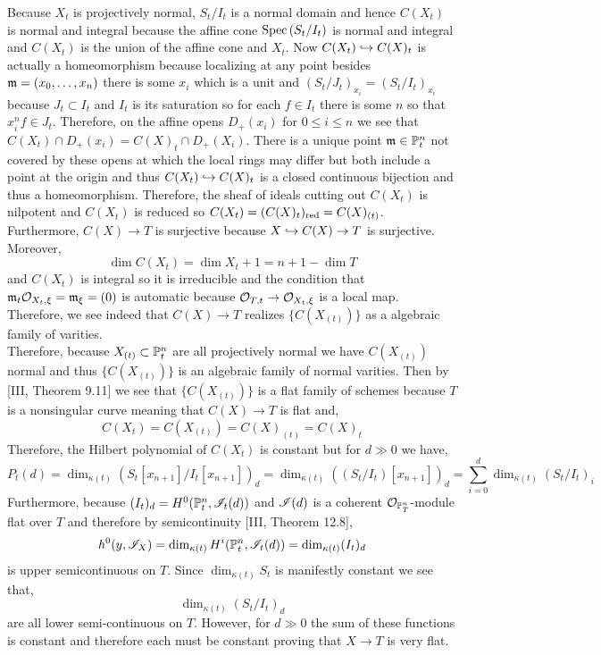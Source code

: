\documentclass[12pt]{article}
\begin{document}
\begin{enumerate}
Because $X_{t}$ is projectively normal, $S_t/I_t$ is a normal domain and hence $C(X_t)$ is normal and integral because the affine cone $\Spec{S_t/I_t}$ is normal and integral and $C(X_t)$ is the union of the affine cone and $X_t$. 
Now $C(X_t) \embed C(X)_t$ is actually a homeomorphism because localizing at any point besides $\m = (x_0, \dots, x_n)$ there is some $x_i$ which is a unit and $(S_t/J_t)_{x_i} = (S_t/I_t)_{x_i}$ because $J_t \subset I_t$ and $I_t$ is its saturation so for each $f \in I_t$ there is some $n$ so that $x_i^n f \in J_t$. Therefore, on the affine opens $D_+(x_i)$ for $0 \le i \le n$ we see that $C(X_t) \cap D_+(x_i) = C(X)_t \cap D_+(X_i)$. There is a unique point $\m \in \P^n_t$ not covered by these opens at which the local rings may differ but both include a point at the origin and thus $C(X_t) \embed C(X)_t$ is a closed continuous bijection and thus a homeomorphism. Therefore, the sheaf of ideals cutting out $C(X_t)$ is nilpotent and $C(X_t)$ is reduced so $C(X_t) = (C(X)_t)_{\red} = C(X)_{(t)}$. Furthermore, $C(X) \to T$ is surjective because $X \embed C(X) \to T$ is surjective. Moreover,
\[ \dim C(X_t) = \dim{X_t} + 1 = n + 1 - \dim{T} \]
and $C(X_t)$ is integral so it is irreducible and the condition that $\m_t \stalk{X_t}{\xi} = \m_{\xi} = (0)$ is automatic because $\stalk{T}{t} \to \stalk{X_t}{\xi}$ is a local map. Therefore, we see indeed that $C(X) \to T$ realizes $\{ C(X_{(t)}) \}$ as a algebraic family of varities. 
\bigskip\\
Therefore, because $X_{(t)} \subset \P^n_t$ are all projectively normal we have $C(X_{(t)})$ normal and thus $\{ C(X_{(t)}) \}$ is an algebraic family of normal varities. Then by [III, Theorem 9.11] we see that $\{ C(X_{(t)}) \}$ is a flat family of schemes because $T$ is a nonsingular curve meaning that $C(X) \to T$ is flat and, 
\[ C(X_t) = C(X_{(t)}) = C(X)_{(t)} = C(X)_t \] Therefore, the Hilbert polynomial of $C(X_t)$ is constant but for $d \gg 0$ we have,
\[ P_t(d) = \dim_{\kappa(t)} (S_t[x_{n+1}]/I_t[x_{n+1}])_d = \dim_{\kappa(t)} ((S_t/I_t)[x_{n+1}])_d = \sum_{i = 0}^d \dim_{\kappa(t)} (S_t/I_t)_{i} \]
Furthermore, because $(I_t)_d = H^0(\P^n_t, \I_t(d))$ and $\I(d)$ is a coherent $\struct{\P^n_T}$-module flat over $T$ and therefore by semicontinuity [III, Theorem 12.8],
\[ h^0(y, \I_X) = \dim_{\kappa(t)} H^i(\P^n_t, \I_t(d)) = \dim_{\kappa(t)} (I_t)_d \]
is upper semicontinuous on $T$. Since $\dim_{\kappa(t)} S_t$ is manifestly constant we see that,
\[ \dim_{\kappa(t)} (S_t/I_t)_d \]
are all lower semi-continuous on $T$. However, for $d \gg 0$ the sum of these functions is constant and therefore each must be constant proving that $X \to T$ is very flat.  
\end{enumerate}
\end{document}
